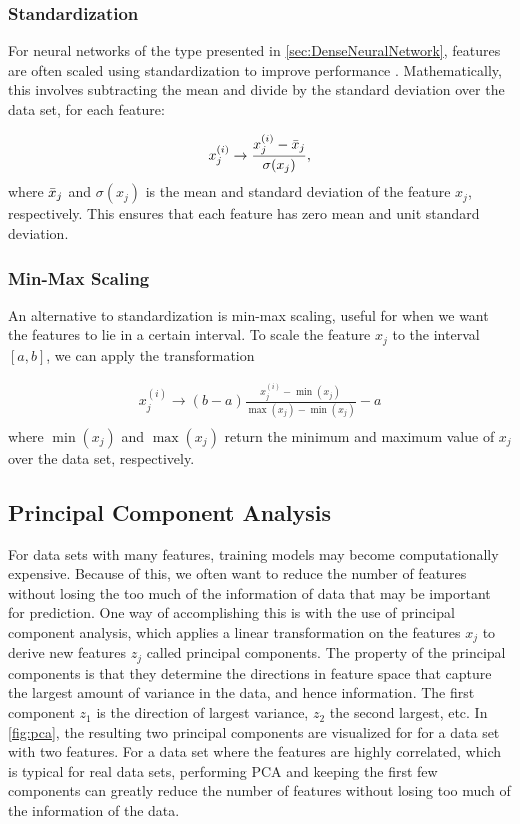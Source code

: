 \subsubsection*{Standardization}
For neural networks of the type presented in \autoref{sec:DenseNeuralNetwork}, features are often scaled using standardization to improve performance \cite{LeCun2012}. Mathematically, this involves subtracting the mean and divide by the standard deviation over the data set, for each feature:

\begin{equation}
    x_j^{(i)} \rightarrow \frac{x_j^{(i)} - \Bar{x}_j}{\sigma(x_j)},
\end{equation}
where $\Bar{x}_j$ and $\sigma(x_j)$ is the mean and standard deviation of the feature $x_j$, respectively. This ensures that each feature has zero mean and unit standard deviation.

\subsubsection*{Min-Max Scaling}
An alternative to standardization is min-max scaling, useful for when we want the features to lie in a certain interval. To scale the feature $x_j$ to the interval $[a, b]$, we can apply the transformation

\begin{equation}
\begin{aligned}
    x_j^{(i)} \rightarrow (b-a)\frac{x_j^{(i)} - \min(x_j)}{\max(x_j) - \min(x_j)} - a\\
\end{aligned}  
\end{equation}
where $\min(x_j)$ and $\max(x_j)$ return the minimum and maximum value of $x_j$ over the data set, respectively.

\subsection{Principal Component Analysis}\label{sec:Principal Component Analysis}
For data sets with many features, training models may become computationally expensive. Because of this, we often want to reduce the number of features without losing the too much of the information of data that may be important for prediction. One way of accomplishing this is with the use of principal component analysis, which applies a linear transformation on the features $x_j$ to derive new features $z_j$ called principal components. The property of the principal components is that they determine the directions in feature space that capture the largest amount of variance in the data, and hence information. The first component $z_1$ is the direction of largest variance, $z_2$ the second largest, etc. In \autoref{fig:pca}, the resulting two principal components are visualized for for a data set with two features. For a data set where the features are highly correlated, which is typical for real data sets, performing PCA and keeping the first few components can greatly reduce the number of features without losing too much of the information of the data.

